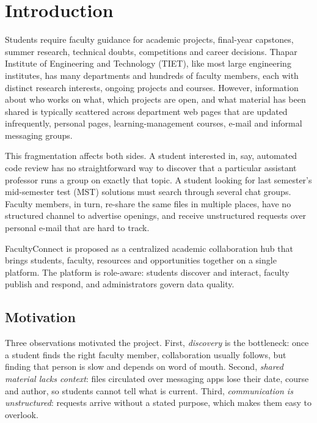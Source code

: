 \documentclass[conference]{IEEEtran}
\begin{document}
\section{Introduction}

Students require faculty guidance for academic projects, final-year capstones, summer research, technical doubts, competitions and career decisions. Thapar Institute of Engineering and Technology (TIET), like most large engineering institutes, has many departments and hundreds of faculty members, each with distinct research interests, ongoing projects and courses. However, information about who works on what, which projects are open, and what material has been shared is typically scattered across department web pages that are updated infrequently, personal pages, learning-management courses, e-mail and informal messaging groups.

This fragmentation affects both sides. A student interested in, say, automated code review has no straightforward way to discover that a particular assistant professor runs a group on exactly that topic. A student looking for last semester's mid-semester test (MST) solutions must search through several chat groups. Faculty members, in turn, re-share the same files in multiple places, have no structured channel to advertise openings, and receive unstructured requests over personal e-mail that are hard to track.

FacultyConnect is proposed as a centralized academic collaboration hub that brings students, faculty, resources and opportunities together on a single platform. The platform is role-aware: students discover and interact, faculty publish and respond, and administrators govern data quality.

\subsection{Motivation}
Three observations motivated the project. First, \emph{discovery} is the bottleneck: once a student finds the right faculty member, collaboration usually follows, but finding that person is slow and depends on word of mouth. Second, \emph{shared material lacks context}: files circulated over messaging apps lose their date, course and author, so students cannot tell what is current. Third, \emph{communication is unstructured}: requests arrive without a stated purpose, which makes them easy to overlook.
\end{document}
